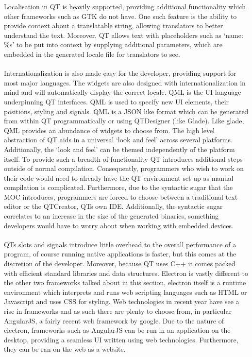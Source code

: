   Localisation in QT is heavily supported, providing additional functionality which other frameworks such as GTK do not have\cite{qt_localisation}. One such feature is the ability to provide context about a translatable string, allowing translators to better understand the text. Moreover, QT allows text with placeholders such as `name: \%s' to be put into context by supplying additional parameters, which are embedded in the generated locale file for translators to see. \\\\
  Internationalization is also made easy for the developer, providing support for most major languages\cite{qt_international}. The widgets are also designed with internationalization in mind and will automatically display the correct locale.
  QML is the UI language underpinning QT interfaces\cite{qt_qml}. QML is used to specify new UI elements, their positions, styling and signals. QML is a JSON like format which can be generated from within QT programmatically or using QTDesigner (like Glade). Like glade, QML provides an abundance of widgets to choose from. The high level abstraction of QT aids in a universal `look and feel' across several platforms. Additionally, the `look and feel' can be themed independently of the platform itself.
  To provide such a breadth of functionality QT introduces additional steps outside of normal compilation. Consequently, programmers who wish to work on their code would need to already have the QT environment set up as manual compilation is complicated. Furthermore, due to the syntactic sugar that the MOC introduces, programmers are forced to choose between a traditional text editor or the QTCreator, QTs own IDE. Additionally,
  the syntactic sugar correlates to an increase in the size of the generated binaries, something developers would have to worry about when working with embedded devices.\\\\
  QTs slots and signals introduce little overhead to the overall performance of a program, of course running native applications is faster, but this comes at the discretion of the developer. Moreover, because QT uses C++ it comes packed with efficient standard libraries and data structures.
Electron is vastly different to the other two frameworks talked about in this section, electron itself is a runtime environment which interprets and runs web scripting languages such as HTML or Javascript and uses CSS for styling\cite{electron}. Web technologies in recent year have see a rise in frameworks and as such there are plenty to choose from, in particular AngularJS, a fairly recent web framework by google. Due to the nature of electron, frameworks such as AngularJS can be run in an application on the desktop, providing a seamless UI written using web technologies. Furthermore, they can be ran on the web as a website.
